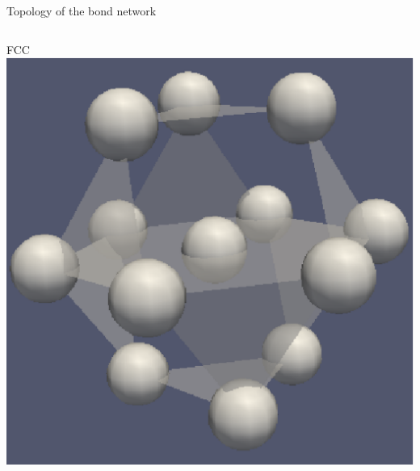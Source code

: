 \begin{frame}{Topology of the bond network}
	\begin{columns}
	\centering FCC\\
	\includegraphics[width=\columnwidth]{fcc_13}
	

\end{columns}
\end{frame}
